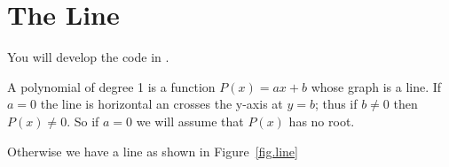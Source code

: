 \section{The Line}
\label{sec.line}

You will develop the code in .


A polynomial of degree 1 is a function $P(x)=a x + b$ whose graph is a line.   If $a=0$ the
line is horizontal an crosses the y-axis at $y=b$; thus if $b\neq 0$ then $P(x)\neq 0$.
So if $a=0$ we will assume that $P(x)$ has no root.   



Otherwise we have a line as shown in Figure~\ref{fig.line}

